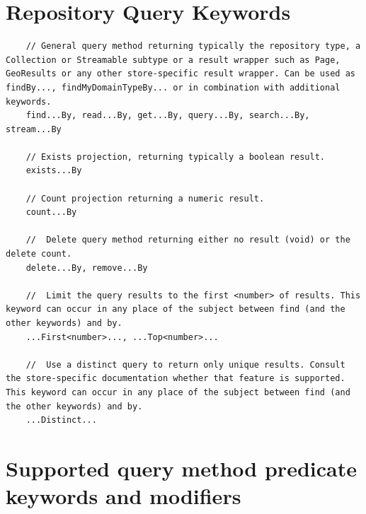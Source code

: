 \documentclass{scrartcl}
\begin{document}
\section{Repository Query Keywords}

\begin{lstlisting}
    // General query method returning typically the repository type, a Collection or Streamable subtype or a result wrapper such as Page, GeoResults or any other store-specific result wrapper. Can be used as findBy..., findMyDomainTypeBy... or in combination with additional keywords.
    find...By, read...By, get...By, query...By, search...By, stream...By

    // Exists projection, returning typically a boolean result.
    exists...By

    // Count projection returning a numeric result.
    count...By

    //  Delete query method returning either no result (void) or the delete count.
    delete...By, remove...By

    //  Limit the query results to the first <number> of results. This keyword can occur in any place of the subject between find (and the other keywords) and by.
    ...First<number>..., ...Top<number>...

    //  Use a distinct query to return only unique results. Consult the store-specific documentation whether that feature is supported. This keyword can occur in any place of the subject between find (and the other keywords) and by.
    ...Distinct...
\end{lstlisting}

\section{Supported query method predicate keywords and modifiers}
\end{document}

